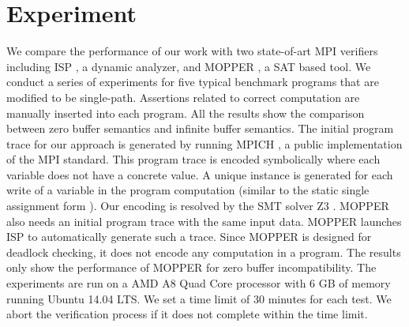 \section{Experiment}
We compare the performance of our work with two state-of-art MPI verifiers including ISP \cite{DBLP:conf/ppopp/VakkalankaSGK08,DBLP:conf/sbmf/SharmaGB12}, a dynamic analyzer, and MOPPER \cite{DBLP:conf/fm/ForejtKNS14}, a SAT based tool. 
We conduct a series of experiments for five typical benchmark programs that are modified to be single-path. Assertions related to correct computation are manually inserted into each program. All the results show the comparison between zero buffer semantics and infinite buffer semantics. The initial program trace for our approach is generated by running MPICH \cite{mpich}, a public implementation of the MPI standard. This program trace is encoded symbolically where each variable does not have a concrete value. A unique instance is generated for each write of a variable in the program computation (similar to the static single assignment form \cite{DBLP:journals/toplas/CytronFRWZ91}). Our encoding is resolved by the SMT solver Z3 \cite{demoura:tacas08}. MOPPER also needs an initial program trace with the same input data. MOPPER launches ISP to automatically generate such a trace. Since MOPPER is designed for deadlock checking, it does not encode any computation in a program. The results only show the performance of MOPPER for zero buffer incompatibility. The experiments are run on a AMD A8 Quad Core processor with 6 GB of memory running Ubuntu 14.04 LTS. We set a time limit of 30 minutes for each test. We abort the verification process if it does not complete within the time limit. 


